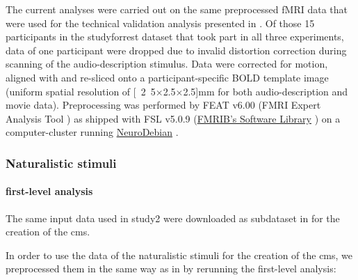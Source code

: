 The current analyses were carried out on the same preprocessed fMRI data
\citep{hanke2016aligned} that were used for the technical validation analysis
presented in \citet{hanke2016simultaneous}.
Of those 15 participants in the studyforrest dataset that took part in all three
experiments, data of one participant were dropped due to invalid distortion
correction during scanning of the audio-description stimulus.
Data were corrected for motion, aligned with and re-sliced onto a
participant-specific BOLD template image \citep{sengupta2016extension} (uniform
spatial resolution of \unit[2.5$\times$2.5$\times$2.5]{mm} for both
audio-description and movie data).
Preprocessing was performed by FEAT v6.00 (FMRI Expert Analysis Tool
\citep{woolrich2001autocorr}) as shipped with FSL v5.0.9
(\href{https://www.fmrib.ox.ac.uk/fsl}{FMRIB's Software Library}
\citep{smith2004fsl}) on a computer-cluster running
\href{http://neuro.debian.net}{NeuroDebian} \citep{halchenko2012open}.



\subsubsection{Naturalistic stimuli}



\paragraph{first-level analysis}


The same input data used in study2 were downloaded as subdataset in
\citep{haeusler2021ppadata} for the creation of the \ac{cms}.

%
In order to use the data of the naturalistic stimuli for the creation of the
\ac{cms}, we preprocessed them in the same way as in
\citep{haeusler2022processing} by rerunning the first-level analysis:

